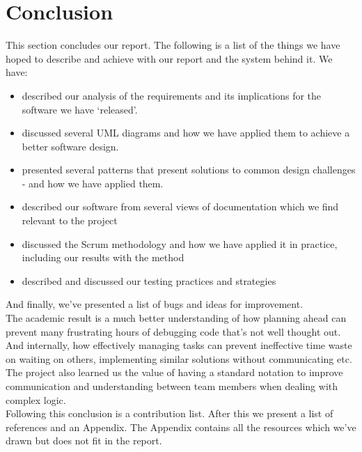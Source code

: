 \section{Conclusion}
This section concludes our report. The following is a list of the things we have hoped to describe and achieve with our report and the system behind it. We have:
\begin{itemize}
\item described our analysis of the requirements and its implications for the software we have `released'. 
\item discussed several UML diagrams and how we have applied them to achieve a better software design. 
\item presented several patterns that present solutions to common design challenges - and how we have applied them. 
\item described our software from several views of documentation which we find relevant to the project
\item discussed the Scrum methodology and how we have applied it in practice, including our results with the method
\item described and discussed our testing practices and strategies
\end{itemize}
And finally, we've presented a list of bugs and ideas for improvement.\\
The academic result is a much better understanding of how planning ahead can prevent many frustrating hours of debugging code that's not well thought out. And internally, how effectively managing tasks can prevent ineffective time waste on waiting on others, implementing similar solutions without communicating etc. The project also learned us the value of having a standard notation to improve communication and understanding between team members when dealing with complex logic.\\
Following this conclusion is a contribution list. After this we present a list of references and an Appendix. The Appendix contains all the resources which we've drawn but does not fit in the report.\\
\newpage